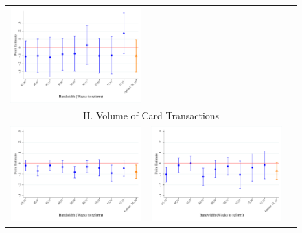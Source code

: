 \documentclass[12pt,notitlepage,a4paper]{article}
\begin{document}
\begin{landscape}
\begin{figure}[ht]
{\begin{tabular}{c c c }
\includegraphics[scale=.4]{output/robust_log_count_trans_3_d_w_0815.pdf} \\
\multicolumn{3}{c}{II.  Volume of Card Transactions} \\
\includegraphics[scale=.4]{output/robust_log_tot_sales_1_d_w_0815.pdf} &
\includegraphics[scale=.4]{output/robust_log_tot_sales_2_d_w_0815.pdf} &

\end{tabular}}
\end{figure}
\end{landscape}
\end{document}
